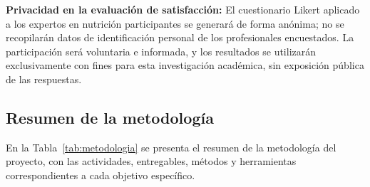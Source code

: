 \textbf{Privacidad en la evaluación de satisfacción:}
El cuestionario Likert aplicado a los expertos en nutrición participantes se
generará de forma anónima; no se recopilarán datos de identificación
personal de los profesionales encuestados. La participación será voluntaria e informada, y los resultados se utilizarán exclusivamente con fines para esta investigación académica, sin exposición pública de las respuestas.

\subsection{Resumen de la metodología}

En la Tabla~\ref{tab:metodologia} se presenta el resumen de la metodología del proyecto,
con las actividades, entregables, métodos y herramientas correspondientes a cada objetivo
específico.

